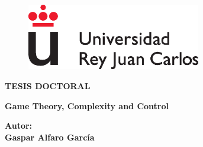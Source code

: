 \documentclass[a4paper,12pt]{newsiambook}
\begin{document}




\begin{center}

\begin{figure}
\centering
\includegraphics[clip,width=7.6cm,trim=0cm 0cm 0cm 0cm]{Images/logoURJC.eps}                        %
\end{figure}


\vspace*{1.5cm}

\begin{center}                                                    %
{\Huge {\bf TESIS DOCTORAL}}
\end{center}

%
%




\vspace*{1.4cm}

\begin{center}                                                     %
	{\LARGE {\bf Game Theory, Complexity and Control}}
\end{center}

\vspace*{1.2cm}







\begin{center}
 { \bf Autor: \\
 	\vspace*{0.25cm}
 \large Gaspar Alfaro García}
\end{center}


\end{center}
\end{document}
